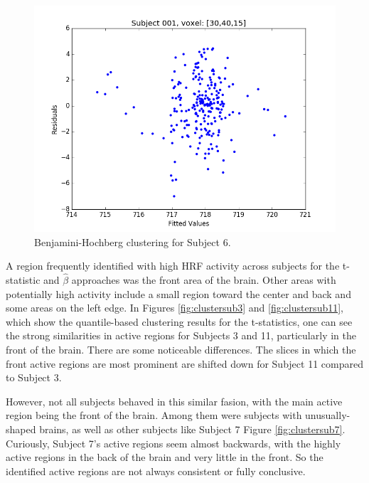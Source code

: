 \begin{figure}[ht]
\begin{minipage}[b]{0.45\linewidth}
	\centering
		\includegraphics[width=.8\linewidth]{../images/Fitted_v_Residuals.png} 
	\caption{Benjamini-Hochberg clustering for Subject 6.}
	\label{fig:clusterBH}
\end{minipage}
\end{figure}

A region frequently identified with high HRF activity across subjects for the 
t-statistic and $\hat{\beta}$ approaches was the front area of the brain. 
Other areas with potentially high activity include a small region toward the 
center and back and some areas on the left edge. In Figures 
\ref{fig:clustersub3} and \ref{fig:clustersub11}, which show the 
quantile-based clustering results for the t-statistics, one can see the strong 
similarities in active regions for Subjects 3 and 11, particularly in the 
front of the brain. There are some noticeable differences. The slices in which 
the front active regions are most prominent are shifted down for Subject 11 
compared to Subject 3. 

However, not all subjects behaved in this similar fasion, with the main active 
region being the front of the brain. Among them were subjects with 
unusually-shaped brains, as well as other subjects like Subject 7 Figure 
\ref{fig:clustersub7}. Curiously, Subject 7's active regions seem almost 
backwards, with the highly active regions in the back of the brain and very 
little in the front. So the identified active regions are not always 
consistent or fully conclusive. 

